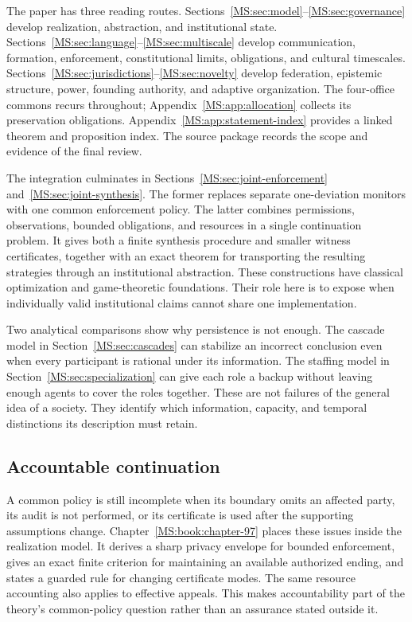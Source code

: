 The paper has three reading routes. Sections~\ref{MS:sec:model}--\ref{MS:sec:governance} develop realization, abstraction, and institutional state. Sections~\ref{MS:sec:language}--\ref{MS:sec:multiscale} develop communication, formation, enforcement, constitutional limits, obligations, and cultural timescales. Sections~\ref{MS:sec:jurisdictions}--\ref{MS:sec:novelty} develop federation, epistemic structure, power, founding authority, and adaptive organization. The four-office commons recurs throughout; Appendix~\ref{MS:app:allocation} collects its preservation obligations. Appendix~\ref{MS:app:statement-index} provides a linked theorem and proposition index. The source package records the scope and evidence of the final review.

The integration culminates in Sections~\ref{MS:sec:joint-enforcement} and~\ref{MS:sec:joint-synthesis}. The former replaces separate one-deviation monitors with one common enforcement policy. The latter combines permissions, observations, bounded obligations, and resources in a single continuation problem. It gives both a finite synthesis procedure and smaller witness certificates, together with an exact theorem for transporting the resulting strategies through an institutional abstraction. These constructions have classical optimization and game-theoretic foundations. Their role here is to expose when individually valid institutional claims cannot share one implementation.

Two analytical comparisons show why persistence is not enough. The cascade model in Section~\ref{MS:sec:cascades} can stabilize an incorrect conclusion even when every participant is rational under its information. The staffing model in Section~\ref{MS:sec:specialization} can give each role a backup without leaving enough agents to cover the roles together. These are not failures of the general idea of a society. They identify which information, capacity, and temporal distinctions its description must retain.

\subsection{Accountable continuation}
A common policy is still incomplete when its boundary omits an affected party, its audit is not performed, or its certificate is used after the supporting assumptions change. Chapter~\ref{MS:book:chapter-97} places these issues inside the realization model. It derives a sharp privacy envelope for bounded enforcement, gives an exact finite criterion for maintaining an available authorized ending, and states a guarded rule for changing certificate modes. The same resource accounting also applies to effective appeals. This makes accountability part of the theory's common-policy question rather than an assurance stated outside it.

